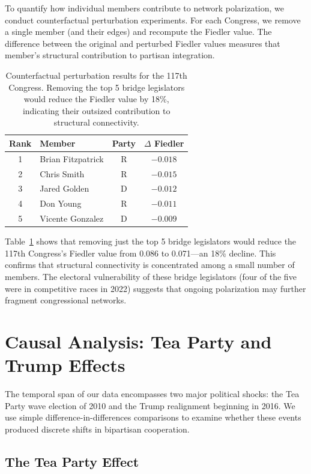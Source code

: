 \documentclass[11pt]{article}
\begin{document}
To quantify how individual members contribute to network polarization, we conduct counterfactual perturbation experiments. For each Congress, we remove a single member (and their edges) and recompute the Fiedler value. The difference between the original and perturbed Fiedler values measures that member's structural contribution to partisan integration.

\begin{table}[H]
\centering
\caption{Counterfactual perturbation results for the 117th Congress. Removing the top 5 bridge legislators would reduce the Fiedler value by 18\%, indicating their outsized contribution to structural connectivity.}
\label{tab:counterfactual}
\small
\begin{tabular}{clcc}
\toprule
Rank & Member & Party & $\Delta$ Fiedler \\
\midrule
1 & Brian Fitzpatrick & R & $-0.018$ \\
2 & Chris Smith & R & $-0.015$ \\
3 & Jared Golden & D & $-0.012$ \\
4 & Don Young & R & $-0.011$ \\
5 & Vicente Gonzalez & D & $-0.009$ \\
\bottomrule
\end{tabular}
\end{table}

Table~\ref{tab:counterfactual} shows that removing just the top 5 bridge legislators would reduce the 117th Congress's Fiedler value from 0.086 to 0.071---an 18\% decline. This confirms that structural connectivity is concentrated among a small number of members. The electoral vulnerability of these bridge legislators (four of the five were in competitive races in 2022) suggests that ongoing polarization may further fragment congressional networks.

\section{Causal Analysis: Tea Party and Trump Effects}

The temporal span of our data encompasses two major political shocks: the Tea Party wave election of 2010 and the Trump realignment beginning in 2016. We use simple difference-in-differences comparisons to examine whether these events produced discrete shifts in bipartisan cooperation.

\subsection{The Tea Party Effect}
\end{document}
